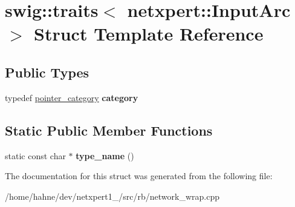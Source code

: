 \hypertarget{structswig_1_1traits_3_01netxpert_1_1InputArc_01_4}{}\section{swig\+:\+:traits$<$ netxpert\+:\+:Input\+Arc $>$ Struct Template Reference}
\label{structswig_1_1traits_3_01netxpert_1_1InputArc_01_4}
\subsection*{Public Types}
\begin{DoxyCompactItemize}
\item 
typedef \hyperlink{structswig_1_1pointer__category}{pointer\+\_\+category} {\bfseries category}\hypertarget{structswig_1_1traits_3_01netxpert_1_1InputArc_01_4_a63ae6d10eadb06d3d2b4ad302c0543f2}{}\label{structswig_1_1traits_3_01netxpert_1_1InputArc_01_4_a63ae6d10eadb06d3d2b4ad302c0543f2}

\end{DoxyCompactItemize}
\subsection*{Static Public Member Functions}
\begin{DoxyCompactItemize}
\item 
static const char $\ast$ {\bfseries type\+\_\+name} ()\hypertarget{structswig_1_1traits_3_01netxpert_1_1InputArc_01_4_a479269f6fde8fe07dbba36658068bb2d}{}\label{structswig_1_1traits_3_01netxpert_1_1InputArc_01_4_a479269f6fde8fe07dbba36658068bb2d}

\end{DoxyCompactItemize}


The documentation for this struct was generated from the following file\+:\begin{DoxyCompactItemize}
\item 
/home/hahne/dev/netxpert1\+\_/src/rb/network\+\_\+wrap.\+cpp\end{DoxyCompactItemize}
